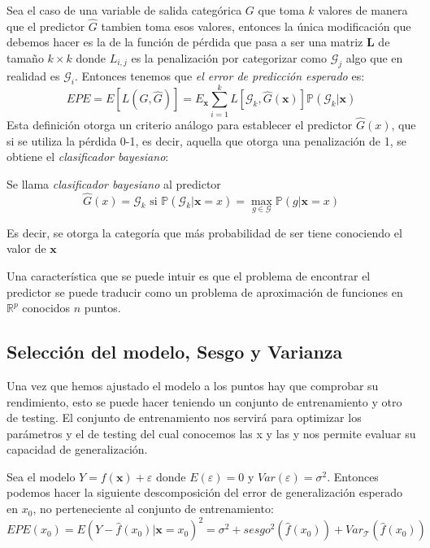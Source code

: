 \noindent Sea el caso de una variable de salida categórica $G$ que toma $k$ valores de manera que el predictor $\hat{G}$ tambien toma esos valores, entonces la única modificación que debemos hacer es la de la función de pérdida que pasa a ser una matriz $\textbf{L}$ de tamaño $k\times k $ donde $L_{i,j}$ es la penalización por categorizar como $\mathcal{G}_j$ algo que en realidad es $\mathcal{G}_i$. Entonces tenemos que \textit{el error de predicción esperado} es: 
\begin{equation}
EPE = E[L(G,\hat{G})]= E_{\textbf{x}}\sum_{i=1}^k L[\mathcal{G}_k, \hat{G}(\textbf{x})]\mathbb{P}(\mathcal{G}_k|\textbf{x})
\end{equation} 
Esta definición otorga un criterio análogo para establecer el predictor $\hat{G}(x)$, que si se utiliza la pérdida 0-1, es decir, aquella que otorga una penalización de 1, se obtiene el \textit{clasificador bayesiano}:
\begin{defi}
Se llama \textit{clasificador bayesiano} al predictor 
\begin{equation}
\hat{G}(x)=\mathcal{G}_k \text{ si } \mathbb{P}(\mathcal{G}_k|\textbf{x}=x)=\max_{g\in \mathcal{G}}\mathbb{P}(g|\textbf{x}=x)
\end{equation}

\noindent Es decir, se otorga la categoría que más probabilidad de ser tiene conociendo el valor de $\textbf{x}$
\end{defi}

\noindent Una característica que se puede intuir es que el problema de encontrar el predictor se puede traducir como un problema de aproximación de funciones en $\mathbb{R}^p$ conocidos $n$ puntos. 

\subsection{Selección del modelo, Sesgo y Varianza}

Una vez que hemos ajustado el modelo a los puntos hay que comprobar su rendimiento, esto se puede hacer teniendo un conjunto de entrenamiento y otro de testing. El conjunto de entrenamiento nos servirá para optimizar los parámetros y el de testing del cual conocemos las x y las y nos permite evaluar su capacidad de generalización. 

\noindent Sea el modelo $Y=f(\textbf{x})+\varepsilon$ donde $E(\varepsilon)=0$ y $Var(\varepsilon)=\sigma^2$. Entonces podemos hacer la siguiente descomposición del error de generalización  esperado en $x_0$, no perteneciente al conjunto de entrenamiento:
\begin{equation}
EPE(x_0)=E(Y-\hat{f}(x_0)|\textbf{x}=x_0)^2=\sigma^2+sesgo^2(\hat{f}(x_0))+Var_{\mathcal{T}}(\hat{f}(x_0))
\end{equation}

